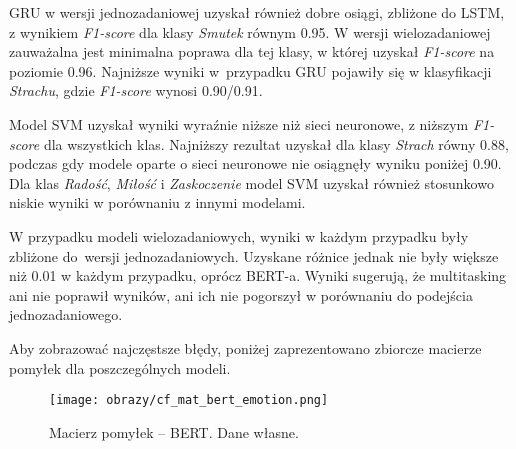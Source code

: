\newpage
GRU w wersji jednozadaniowej uzyskał również dobre osiągi, zbliżone do LSTM, z wynikiem \textit{F1-score} dla klasy \textit{Smutek} równym 0.95. W wersji wielozadaniowej zauważalna jest minimalna poprawa dla tej klasy, w której uzyskał \textit{F1-score} na poziomie 0.96. Najniższe wyniki w~przypadku GRU pojawiły się w klasyfikacji \textit{Strachu}, gdzie \textit{F1-score} wynosi 0.90/0.91.

Model SVM uzyskał wyniki wyraźnie niższe niż sieci neuronowe, z niższym \textit{F1-score} dla wszystkich klas. Najniższy rezultat uzyskał dla klasy \textit{Strach} równy 0.88, podczas gdy modele oparte o sieci neuronowe nie osiągnęły wyniku poniżej 0.90. Dla klas \textit{Radość}, \textit{Miłość} i \textit{Zaskoczenie} model SVM uzyskał również stosunkowo niskie wyniki w porównaniu z innymi modelami. 

W przypadku modeli wielozadaniowych, wyniki w każdym przypadku były zbliżone do~wersji jednozadaniowych. Uzyskane różnice jednak nie były większe niż 0.01 w każdym przypadku, oprócz BERT-a. Wyniki sugerują, że multitasking ani nie poprawił wyników, ani ich nie pogorszył w porównaniu do podejścia jednozadaniowego.

\raggedbottom
\vspace{15pt}
Aby zobrazować najczęstsze błędy, poniżej zaprezentowano zbiorcze macierze pomyłek dla poszczególnych modeli.

\vspace{35pt}
\begin{figure}[H]
    \centering
    \texttt{[image: obrazy/cf\_mat\_bert\_emotion.png]}
    \caption{Macierz pomyłek -- BERT. Dane własne.}
    \label{fig:cf_bert_emotion}
\end{figure}

